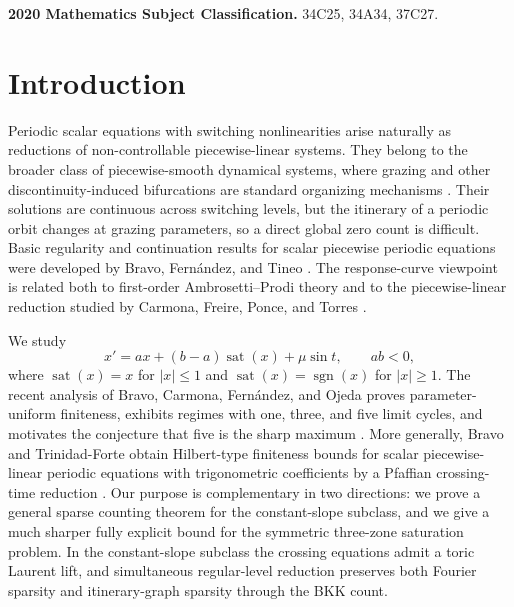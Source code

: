 \documentclass[11pt]{article}
\begin{document}
\smallskip
\noindent\textbf{2020 Mathematics Subject Classification.} 34C25, 34A34, 37C27.

\section{Introduction}\label{sec:introduction}

Periodic scalar equations with switching nonlinearities arise naturally as reductions of non-controllable piecewise-linear systems.  They belong to the broader class of piecewise-smooth dynamical systems, where grazing and other discontinuity-induced bifurcations are standard organizing mechanisms \cite{diBernardoBuddChampneysKowalczyk2008}.  Their solutions are continuous across switching levels, but the itinerary of a periodic orbit changes at grazing parameters, so a direct global zero count is difficult.  Basic regularity and continuation results for scalar piecewise periodic equations were developed by Bravo, Fern\'andez, and Tineo \cite{BravoFernandezTineo2007}.  The response-curve viewpoint is related both to first-order Ambrosetti--Prodi theory \cite{BravoFernandezTineo2002} and to the piecewise-linear reduction studied by Carmona, Freire, Ponce, and Torres \cite{CarmonaFreirePonceTorres2004}.

We study
\begin{equation}\label{eq:original}
 x'=ax+(b-a)\operatorname{sat}(x)+\mu\sin t,
 \qquad ab<0,
\end{equation}
where $\operatorname{sat}(x)=x$ for $|x|\le1$ and $\operatorname{sat}(x)=\operatorname{sgn}(x)$ for $|x|\ge1$.  The recent analysis of Bravo, Carmona, Fern\'andez, and Ojeda proves parameter-uniform finiteness, exhibits regimes with one, three, and five limit cycles, and motivates the conjecture that five is the sharp maximum \cite{BravoCarmonaFernandezOjeda2025}.  More generally, Bravo and Trinidad-Forte obtain Hilbert-type finiteness bounds for scalar piecewise-linear periodic equations with trigonometric coefficients by a Pfaffian crossing-time reduction \cite{BravoTrinidadForte2026}.  Our purpose is complementary in two directions: we prove a general sparse counting theorem for the constant-slope subclass, and we give a much sharper fully explicit bound for the symmetric three-zone saturation problem.  In the constant-slope subclass the crossing equations admit a toric Laurent lift, and simultaneous regular-level reduction preserves both Fourier sparsity and itinerary-graph sparsity through the BKK count.
\end{document}
